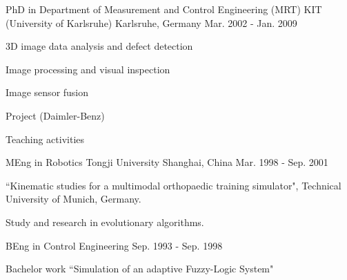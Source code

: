 \documentclass[../resume_xin.tex]{subfiles}
\begin{document}
\begin{cventries}
  \cventry
    {PhD in Department of Measurement and Control Engineering (MRT)} %
    {KIT (University of Karlsruhe)} %
    {Karlsruhe, Germany} %
    {Mar. 2002 - Jan. 2009} %
    {
      \begin{cvitems} %
        \item 3D image data analysis and defect detection
        \item Image processing and visual inspection
        \item Image sensor fusion
        \item Project (Daimler-Benz)
        \item Teaching activities
      \end{cvitems}
    }

  \cventry
    {MEng in Robotics} %
    {Tongji University} %
    {Shanghai, China} %
    {Mar. 1998 - Sep. 2001} %
    {
      \begin{cvitems} %
        \item ``Kinematic studies for a multimodal orthopaedic training simulator", Technical University of Munich, Germany.
        \item Study and research in evolutionary algorithms.
      \end{cvitems}
    }

  \cventry
    {BEng in Control Engineering} %
    {} %
    {} %
    {Sep. 1993 - Sep. 1998} %
    {
      \begin{cvitems} %
        \item Bachelor work ``Simulation of an adaptive Fuzzy-Logic System"
      \end{cvitems}
    }

\end{cventries}
\end{document}

